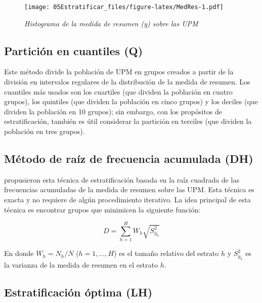 \documentclass[
  12pt,
  spanish,
]{book}
\begin{document}
\begin{figure}
\centering
\texttt{[image: 05Estratificar\_files/figure-latex/MedRes-1.pdf]}
\caption{\label{fig:MedRes}\emph{Histograma de la medida de resumen (y) sobre las UPM}}
\end{figure}

\hypertarget{particiuxf3n-en-cuantiles-q}{%
\subsection*{Partición en cuantiles (Q)}\label{particiuxf3n-en-cuantiles-q}}

Este método divide la población de UPM en grupos creados a partir de la división en intervalos regulares de la distribución de la medida de resumen. Los cuantiles más usados son los cuartiles (que dividen la población en cuatro grupos), los quintiles (que dividen la población en cinco grupos) y los deciles (que dividen la población en 10 grupos); sin embargo, con los propósitos de estratificación, también es útil considerar la partición en terciles (que dividen la población en tres grupos).

\hypertarget{muxe9todo-de-rauxedz-de-frecuencia-acumulada-dh}{%
\subsection*{Método de raíz de frecuencia acumulada (DH)}\label{muxe9todo-de-rauxedz-de-frecuencia-acumulada-dh}}

\citet{Dalenius_Hodges_1959} propusieron esta técnica de estratificación basada en la raíz cuadrada de las frecuencias acumuladas de la medida de resumen sobre las UPM. Esta técnica es exacta y no requiere de algún procedimiento iterativo. La idea principal de esta técnica es encontrar grupos que minimicen la siguiente función:

\[
D = \sum_{h=1}^H W_h \sqrt{S^2_{y_{h}}}
\]

En donde \(W_h = N_h/N\) (\(h = 1, \ldots, H\)) es el tamaño relativo del estrato \(h\) y \(S^2_{y_{h}}\) es la varianza de la medida de resumen en el estrato \(h\).

\hypertarget{estratificaciuxf3n-uxf3ptima-lh}{%
\subsection*{Estratificación óptima (LH)}\label{estratificaciuxf3n-uxf3ptima-lh}}
\end{document}
